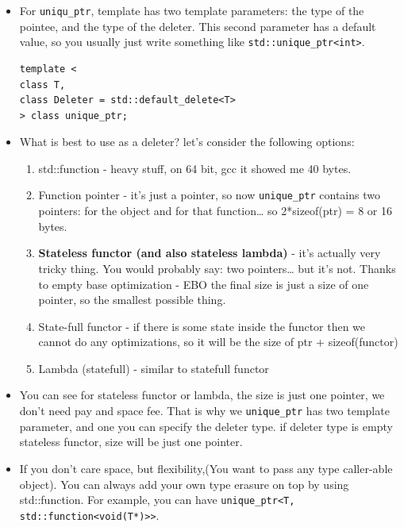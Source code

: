 \documentclass[a4paper,11pt,twoside]{book}
\begin{document}
\begin{itemize}
	\item For \texttt{uniqu\_ptr}, template has two template parameters: the type of the pointee, and the type of the deleter. This second parameter has a default value, so you usually just write something like \texttt{std::unique\_ptr<int>}.
\begin{lstlisting}
template <
class T,
class Deleter = std::default_delete<T>
> class unique_ptr;
	\end{lstlisting}

	\item What is best to use as a deleter? let's consider the following options:
	\begin{enumerate}
		\item std::function - heavy stuff, on 64 bit, gcc it showed me 40 bytes.
		
		\item Function pointer - it’s just a pointer, so now \texttt{unique\_ptr} contains two pointers: for the object and for that function… so 2*sizeof(ptr) = 8 or 16 bytes.
		
		\item \textbf{Stateless functor (and also stateless lambda)} - it’s actually very tricky thing. You would probably say: two pointers… but it’s not. Thanks to empty base optimization - EBO the final size is just a size of one pointer, so the smallest possible thing.
		
		\item State-full functor - if there is some state inside the functor then we cannot do any optimizations, so it will be the size of ptr + sizeof(functor)
		
		\item Lambda (statefull) - similar to statefull functor
	\end{enumerate}

	\item You can see for stateless functor or lambda, the size is just one pointer, we don't need pay and space fee. That is why we \texttt{unique\_ptr} has two template parameter, and one you can specify the deleter type. if deleter type is empty stateless functor, size will be just one pointer. 
	
	
	\item If you don't care space, but flexibility,(You want to pass any type caller-able object).  You can always add your own type erasure on top by using std::function. For example, you can have \texttt{unique\_ptr<T, std::function<void(T*)>>}.
	

\end{itemize}
\end{document}
